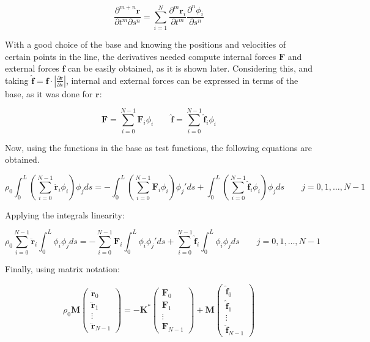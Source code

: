 \documentclass[10pt] {article}
\newcommand{\ba}{\begin{array}}
\newcommand{\ea}{\end{array}}
\newcommand{\pa}{\partial}
\begin{document}
$$ \frac{ \pa^{m+n} \mathbf{r}}{\pa t^m \pa s^n} = \sum_{i=1}^N \frac{\pa^m \mathbf{r}_{i}}{\pa t^m} \frac{\pa^n \phi_i}{\pa s^n}$$

With a good choice of the base and knowing the positions and velocities of certain points in the line, the derivatives needed compute internal forces $\mathbf{F}$ and external forces $\mathbf{f}$ can be easily obtained, as it is shown later. Considering this, and taking $\hat{\mathbf{f}} =  \mathbf{f}\cdot \left| \frac{\pa \mathbf{r}}{\pa s}\right|$, internal and external forces can be expressed in terms of the base, as it was done for $\mathbf{r}$:

$$ \mathbf{F} = \sum_{i=0}^{N-1} \mathbf{F}_{i} \phi_i \qquad \hat{\mathbf{f}} = \sum_{i=0}^{N-1} \hat{\mathbf{f}}_{i} \phi_i$$

Now, using the functions in the base as test functions, the following equations are obtained.

\begin{equation}
\rho_{0}\int_0^L \left(\sum_{i=0}^{N-1}\ddot{\mathbf{r}}_i\phi_i\right)  \phi_j ds = - \int_0^L  \left(\sum_{i=0}^{N-1}\mathbf{F}_i\phi_i\right)\phi_j' ds  + \int_0^L \left(\sum_{i=0}^{N-1}\hat{\mathbf{f}}_i\phi_i\right)\phi_j ds \qquad j = 0,1,\ldots, N-1 
\end{equation}

Applying the integrals linearity:

\begin{equation}
\rho_{0}\sum_{i=0}^{N-1}\ddot{\mathbf{r}}_i\int_0^L \phi_i  \phi_j ds = - \sum_{i=0}^{N-1}\mathbf{F}_i\int_0^L  \phi_i\phi_j' ds  + \sum_{i=0}^{N-1}\hat{\mathbf{f}}_i\int_0^L \phi_i\phi_j ds \qquad j = 0,1,\ldots, N-1
\end{equation}

Finally, using matrix notation:

\begin{equation}
\displaystyle
\rho_{0}\mathbf{M}\left(\ba{c} \ddot{\mathbf{r}}_0 \\ \ddot{\mathbf{r}}_1 \\ \vdots \\ \ddot{\mathbf{r}}_{N-1} \ea\right) = - \mathbf{K}^* \left(\ba{c}\mathbf{F}_0 \\ \mathbf{F}_1 \\ \vdots \\ \mathbf{F}_{N-1} \ea\right) + \mathbf{M} \left(\ba{c} \hat{\mathbf{f}}_0 \\ \hat{\mathbf{f}}_1 \\ \vdots \\ \hat{\mathbf{f}}_{N-1} \ea\right)
\end{equation}
\end{document}
